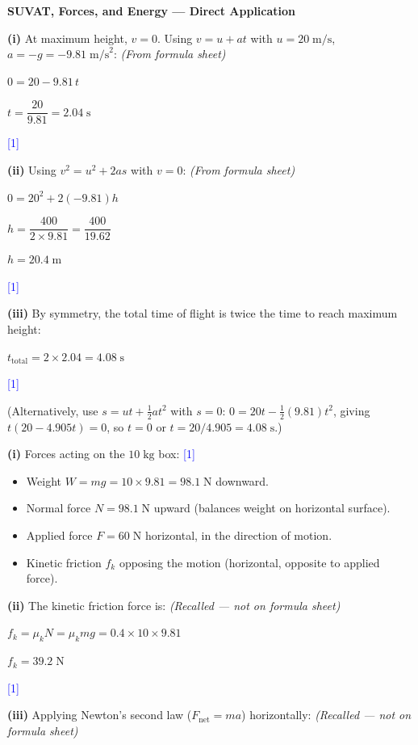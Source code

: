 \documentclass[12pt,a4paper]{article}
\newcommand{\markstep}[1]{\hfill\textcolor{blue}{[#1]}}
\newcommand{\finalanswer}[1]{%
  \begin{tcolorbox}[colback=green!5!white,colframe=green!50!black,boxrule=0.5pt]
  #1
  \end{tcolorbox}
}
\newcommand{\fromsheet}{\textit{(From formula sheet)}}
\newcommand{\recalled}{\textit{(Recalled --- not on formula sheet)}}
\begin{document}
\noindent\textbf{SUVAT, Forces, and Energy --- Direct Application}

\begin{parts}

\item

\textbf{(i)} At maximum height, $v = 0$. Using $v = u + at$ with $u = 20\;\text{m/s}$, $a = -g = -9.81\;\text{m/s}^2$: \fromsheet

$0 = 20 - 9.81\,t$

\finalanswer{$t = \dfrac{20}{9.81} = 2.04\;\text{s}$} \markstep{1}

\textbf{(ii)} Using $v^2 = u^2 + 2as$ with $v = 0$: \fromsheet

$0 = 20^2 + 2(-9.81)h$

$h = \dfrac{400}{2\times 9.81} = \dfrac{400}{19.62}$

\finalanswer{$h = 20.4\;\text{m}$} \markstep{1}

\textbf{(iii)} By symmetry, the total time of flight is twice the time to reach maximum height:

\finalanswer{$t_{\text{total}} = 2\times 2.04 = 4.08\;\text{s}$} \markstep{1}

(Alternatively, use $s = ut + \frac{1}{2}at^2$ with $s = 0$: $0 = 20t - \frac{1}{2}(9.81)t^2$, giving $t(20 - 4.905t) = 0$, so $t = 0$ or $t = 20/4.905 = 4.08\;\text{s}$.)

\item

\textbf{(i)} Forces acting on the $10\;\text{kg}$ box: \markstep{1}
\begin{itemize}
\item Weight $W = mg = 10\times 9.81 = 98.1\;\text{N}$ downward.
\item Normal force $N = 98.1\;\text{N}$ upward (balances weight on horizontal surface).
\item Applied force $F = 60\;\text{N}$ horizontal, in the direction of motion.
\item Kinetic friction $f_k$ opposing the motion (horizontal, opposite to applied force).
\end{itemize}

\textbf{(ii)} The kinetic friction force is: \recalled

$f_k = \mu_k N = \mu_k mg = 0.4\times 10\times 9.81$

\finalanswer{$f_k = 39.2\;\text{N}$} \markstep{1}

\textbf{(iii)} Applying Newton's second law ($F_{\text{net}} = ma$) horizontally: \recalled


\end{parts}
\end{document}

